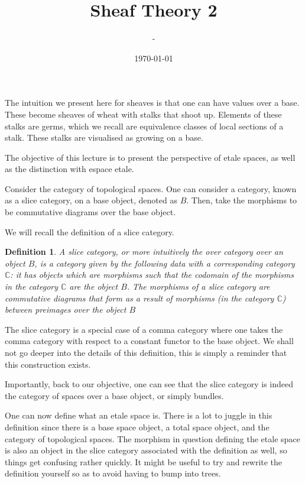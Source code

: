\documentclass[12pt]{article}
\title{Sheaf Theory 2}
\author{-}
\date{\today}
\newtheorem{definition}{Definition}
\begin{document}
\maketitle

The intuition we present here for sheaves is that one can have values over a base. These become sheaves of wheat with stalks that shoot up. Elements of these stalks are germs, which we recall are equivalence classes of local sections of a stalk. These stalks are visualised as growing on a base.

The objective of this lecture is to present the perspective of etale spaces, as well as the distinction with espace etale.

Consider the category of topological spaces. One can consider a category, known as a slice category, on a base object, denoted as $B$. Then, take the morphisms to be commutative diagrams over the base object. 

We will recall the definition of a slice category.

\begin{definition}
A slice category, or more intuitively the over category over an object $B$, is a category given by the following data with a corresponding category $\mathbb{C}$: it has objects which are morphisms such that the codomain of the morphisms in the category $\mathbb{C}$ are the object $B$. The morphisms of a slice category are commutative diagrams that form as a result of morphisms (in the category $\mathbb{C}$) between preimages over the object $B$
\end{definition}

The slice category is a special case of a comma category where one takes the comma category with respect to a constant functor to the base object. We shall not go deeper into the details of this definition, this is simply a reminder that this construction exists.

Importantly, back to our objective, one can see that the slice category is indeed the category of spaces over a base object, or simply bundles.

One can now define what an etale space is. There is a lot to juggle in this definition since there is a base space object, a total space object, and the category of topological spaces. The morphism in question defining the etale space is also an object in the slice category associated with the definition as well, so things get confusing rather quickly. It might be useful to try and rewrite the definition yourself so as to avoid having to bump into trees.
\end{document}
